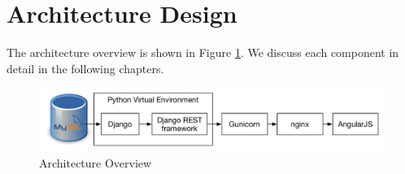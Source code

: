 \section{Architecture Design}
\par The architecture overview is shown in Figure \ref{fig:architecture}. We discuss each component in detail in the following chapters.

\begin{figure}
\centering
\includegraphics[width=\textwidth]{figures/architecture.pdf}
\caption{\label{fig:architecture} Architecture Overview}
\end{figure}





